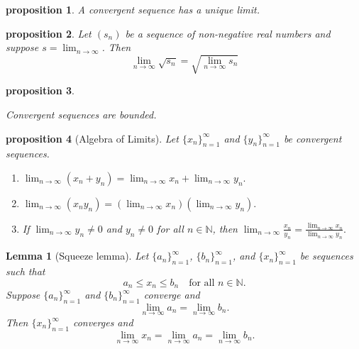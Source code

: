 \documentclass{article}
\newtheorem{lemma}{Lemma}[section]
\newtheorem{proposition}{Proposition}[section]
\newtheorem{proposition}{proposition}[section]
\theoremstyle{definition}
\theoremstyle{remark}
\begin{document}
\begin{proposition} \label{prp:uniqueness_of_limit}
A convergent sequence has a unique limit.
\end{proposition}






\begin{proposition}

Let \( (s_n)\) be a sequence of non-negative real numbers and suppose \( s = \lim_{n \to \infty}\). Then
\[
\lim_{n \to \infty}{\sqrt{s_n}} = \sqrt{\lim_{n \to \infty}{s_n}}
\]

\end{proposition}





\begin{proposition}\label{prp: convergent sequences are bounded}

Convergent sequences are bounded.

\end{proposition}






\begin{proposition}[Algebra of Limits] \label{prop:limit_algebra}
Let \( \{x_n\}_{n=1}^{\infty} \) and \( \{y_n\}_{n=1}^{\infty} \) be convergent sequences.
\begin{enumerate}
\item 
\(
\lim_{n\to\infty} (x_n + y_n) = \lim_{n\to\infty} x_n + \lim_{n\to\infty} y_n.
\)
\item 
\(
\lim_{n\to\infty} (x_n y_n) = \left( \lim_{n\to\infty} x_n \right) \left( \lim_{n\to\infty} y_n \right).
\)
\item If \( \lim_{n\to\infty} y_n \neq 0 \) and \( y_n \neq 0 \) for all \( n \in \mathbb{N} \), then
\(
\lim_{n\to\infty} \frac{x_n}{y_n} = \frac{\lim_{n\to\infty} x_n}{\lim_{n\to\infty} y_n}.
\)
\end{enumerate}
\end{proposition}



\begin{lemma}[Squeeze lemma] \label{lem:squeeze}
Let \( \{a_n\}_{n=1}^{\infty} \), \( \{b_n\}_{n=1}^{\infty} \), and \( \{x_n\}_{n=1}^{\infty} \) be sequences such that
\[
a_n \leq x_n \leq b_n \quad \text{for all } n \in \mathbb{N}.
\]
Suppose \( \{a_n\}_{n=1}^{\infty} \) and \( \{b_n\}_{n=1}^{\infty} \) converge and
\[
\lim_{n\to\infty} a_n = \lim_{n\to\infty} b_n.
\]
Then \( \{x_n\}_{n=1}^{\infty} \) converges and
\[
\lim_{n\to\infty} x_n = \lim_{n\to\infty} a_n = \lim_{n\to\infty} b_n.
\]
\end{lemma}
\end{document}

